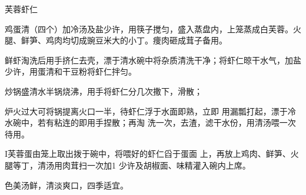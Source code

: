 \begin{recipe}{芙蓉虾仁}

\ingredients


\cooking

\step 鸡蛋清（四个）加冷汤及盐少许，用筷子搅匀，盛入蒸盘内，上笼蒸成白芙蓉。火腿、鲜笋、鸡肉均切成豌豆米大的小丁。痩肉砸成茸子备用。

\step 鲜虾淘洗后用手挤仁去壳，漂于清水碗中将杂质清洗干净；将虾仁晾干水气，加盐少许，用蛋清和干豆粉将虾仁拌匀。

\step 炒锅盛清水半锅烧沸，用手将虾仁分几次撒下，滑散；

炉火过大可将锅提离火口一半，待虾仁浮于水面即熟，立即 用漏瓢打起，漂于冷水碗中，若有粘连的即用手捏散；再淘 洗一次，去渣，滤干水份，用清汤喂一次待用。

I芙蓉蛋由笼上取出拨于碗中，将喂好的虾仁舀于蛋面 上，再放上鸡肉、鲜笋、火腿等丁，清汤用肉茸扫一次加1 少许及胡椒面、味精灌入碗内上席。

\notes

色美汤鲜，清淡爽口，四季适宜。

\end{recipe}

